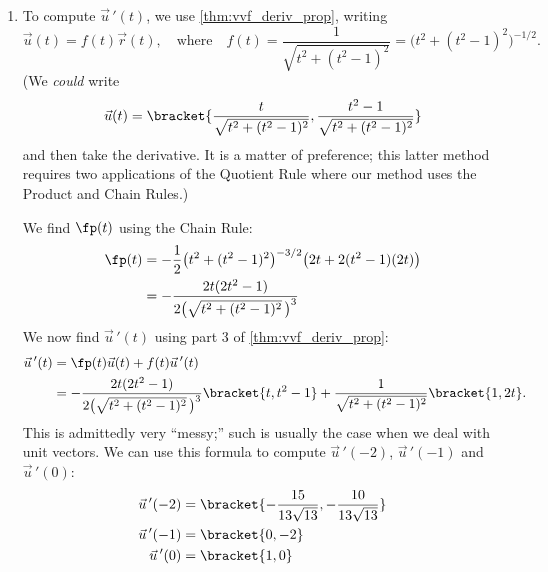 \begin{example}
\begin{enumerate}
	\item		To compute $\vec u\,'(t)$, we use \autoref{thm:vvf_deriv_prop}, writing
	\[\vec u(t) = f(t)\vec r(t),\quad  \text{where}\quad f(t) = \frac{1}{\sqrt{t^2+(t^2-1)^2}}=\big(t^2+(t^2-1)^2\big)^{-1/2}.\]
	(We \emph{could} write
	\[\vec u(t) =\bracket{\frac{t}{\sqrt{t^2+(t^2-1)^2}}, \frac{t^2-1}{\sqrt{t^2+(t^2-1)^2}}}\]
	and then take the derivative. It is a matter of preference; this latter method requires two applications of the Quotient Rule where our method uses the Product and Chain Rules.)
	
We find $\fp(t)$ using the Chain Rule:
\begin{align*}
\fp(t) &= -\frac12\big(t^2+(t^2-1)^2\big)^{-3/2}\big(2t+2(t^2-1)(2t)\big)\\
			&= -\frac{2t(2t^2-1)}{2\big(\sqrt{t^2+(t^2-1)^2}\,\big)^3}
\end{align*}
We now find $\vec u\,'(t)$ using part 3 of \autoref{thm:vvf_deriv_prop}:
\begin{align*}
\vec u\,'(t) &=  \fp(t)\vec u(t) + f(t)\vec u\,'(t) \\
				&=  -\frac{2t(2t^2-1)}{2\big(\sqrt{t^2+(t^2-1)^2}\,\big)^3}\bracket{t,t^2-1}+ \frac{1}{\sqrt{t^2+(t^2-1)^2}}\bracket{1,2t}.
\end{align*}
This is admittedly very ``messy;'' such is usually the case when we deal with unit vectors. We can use this formula to compute $\vec u\,'(-2)$, $\vec u\,'(-1)$ and $\vec u\,'(0)$:
\begin{align*}
\vec u\,'(-2) &=\bracket{-\frac{15}{13 \sqrt{13}},-\frac{10}{13
   \sqrt{13}}}%
   \\
\vec u\,'(-1) &=\bracket{0,-2}\\
\vec u\,'(0) &=\bracket{1,0}
\end{align*}
%
\end{enumerate}
\end{example}
